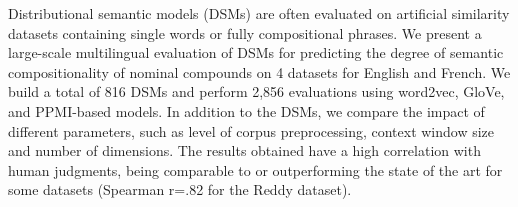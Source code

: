 Distributional semantic models (DSMs) are often evaluated on artificial similarity datasets containing single words or fully compositional phrases.  We present a large-scale multilingual evaluation of DSMs for predicting the degree of semantic compositionality of nominal compounds on 4 datasets for English and French.  We build a total of 816 DSMs and perform 2,856 evaluations using word2vec, GloVe, and PPMI-based models.  In addition to the DSMs, we compare the impact of different parameters, such as level of corpus preprocessing, context window size and number of dimensions.  The results obtained have a high correlation with human judgments, being comparable to or outperforming the state of the art for some datasets (Spearman r=.82 for the Reddy dataset).
